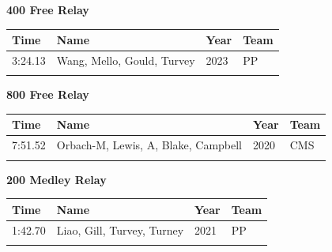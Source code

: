\noindent\begin{minipage}[t]{0.98\textwidth}
\centering
\textbf{\textcolor{teamprimary}{400 Free Relay}}\par
\vspace{0.5em}
\centering
\small
\renewcommand{\arraystretch}{1.0}
\setlength{\tabcolsep}{4pt}
\begin{tabular}{@{}p{2.7cm}p{4.3cm}p{1.6cm}p{2.7cm}@{}}
\toprule
\textbf{Time} & \textbf{Name} & \textbf{Year} & \textbf{Team} \\
\midrule
3:24.13 & Wang, Mello, Gould, Turvey & 2023 & PP \\
\bottomrule
\vspace{0.5em}
\end{tabular}
\end{minipage}
\vspace{1.2em}
\noindent\begin{minipage}[t]{0.98\textwidth}
\centering
\textbf{\textcolor{teamprimary}{800 Free Relay}}\par
\vspace{0.5em}
\centering
\small
\renewcommand{\arraystretch}{1.0}
\setlength{\tabcolsep}{4pt}
\begin{tabular}{@{}p{2.7cm}p{4.3cm}p{1.6cm}p{2.7cm}@{}}
\toprule
\textbf{Time} & \textbf{Name} & \textbf{Year} & \textbf{Team} \\
\midrule
7:51.52 & Orbach-M, Lewis, A, Blake, Campbell & 2020 & CMS \\
\bottomrule
\vspace{0.5em}
\end{tabular}
\end{minipage}
\vspace{1.2em}
\noindent\begin{minipage}[t]{0.98\textwidth}
\centering
\textbf{\textcolor{teamprimary}{200 Medley Relay}}\par
\vspace{0.5em}
\centering
\small
\renewcommand{\arraystretch}{1.0}
\setlength{\tabcolsep}{4pt}
\begin{tabular}{@{}p{2.7cm}p{4.3cm}p{1.6cm}p{2.7cm}@{}}
\toprule
\textbf{Time} & \textbf{Name} & \textbf{Year} & \textbf{Team} \\
\midrule
1:42.70 & Liao, Gill, Turvey, Turney & 2021 & PP \\
\bottomrule
\vspace{0.5em}
\end{tabular}
\end{minipage}
\vspace{1.2em}
